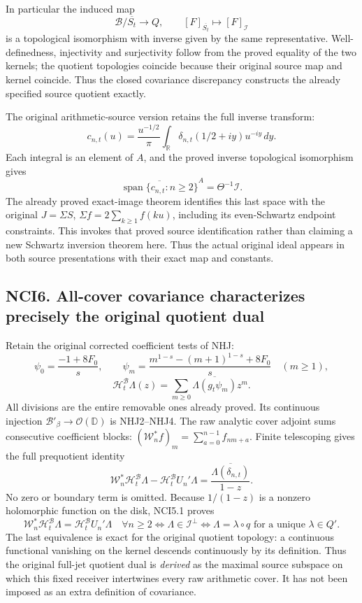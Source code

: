 In particular the induced map \[
\mathcal B/\overline{S_t}\longrightarrow Q,
\qquad [F]_{\overline{S_t}}\longmapsto[F]_{\mathcal I}
\tag{NCI5.3}
\] is a topological isomorphism with inverse given by the same
representative. Well-definedness, injectivity and surjectivity follow
from the proved equality of the two kernels; the quotient topologies
coincide because their original source map and kernel coincide. Thus the
closed covariance discrepancy constructs the already specified source
quotient exactly.

The original arithmetic-source version retains the full inverse
transform: \[
c_{n,t}(u)=\frac{u^{-1/2}}\pi
\int_{\mathbb R}\delta_{n,t}(1/2+iy)u^{-iy}\,dy.
\tag{NCI5.4}
\] Each integral is an element of \(A\), and the proved inverse
topological isomorphism gives \[
\overline{\operatorname{span}\{c_{n,t}:n\ge2\}}^A
=\Theta^{-1}\mathcal I.
\tag{NCI5.5}
\] The already proved exact-image theorem identifies this last space
with the original \(J=\Sigma S\), \(\Sigma f=2\sum_{k\ge1}f(ku)\),
including its even-Schwartz endpoint constraints. This invokes that
proved source identification rather than claiming a new Schwartz
inversion theorem here. Thus the actual original ideal appears in both
source presentations with their exact map and constants.

\subsection{NCI6. All-cover covariance characterizes precisely the
original quotient
dual}\label{nci6.-all-cover-covariance-characterizes-precisely-the-original-quotient-dual}

Retain the original corrected coefficient tests of NHJ: \[
\psi_0=\frac{-1+8F_0}s,\qquad
\psi_m=\frac{m^{1-s}-(m+1)^{1-s}+8F_0}s\quad(m\ge1),
\] \[
\mathcal H_t^{\mathcal B}\Lambda(z)
=\sum_{m\ge0}\overline{\Lambda(g_t\psi_m)}z^m.
\tag{NCI6.1}
\] All divisions are the entire removable ones already proved. Its
continuous injection \(\mathcal B'_\beta\to\mathcal O(\mathbb D)\) is
NHJ2--NHJ4. The raw analytic cover adjoint sums consecutive coefficient
blocks: \((\mathscr W_n^*f)_m=\sum_{a=0}^{n-1}f_{nm+a}\). Finite
telescoping gives the full prequotient identity \[
\mathscr W_n^*\mathcal H_t^{\mathcal B}\Lambda
-\mathcal H_t^{\mathcal B}U_n'\Lambda
=\frac{\overline{\Lambda(\delta_{n,t})}}{1-z}.
\tag{NCI6.2}
\] No zero or boundary term is omitted. Because \(1/(1-z)\) is a nonzero
holomorphic function on the disk, NCI5.1 proves \[
\boxed{
\mathscr W_n^*\mathcal H_t^{\mathcal B}\Lambda
=\mathcal H_t^{\mathcal B}U_n'\Lambda\quad\forall n\ge2
\iff\Lambda\in\mathcal I^\perp
\iff\Lambda=\lambda\circ q\text{ for a unique }\lambda\in Q'.}
\tag{NCI6.3}
\] The last equivalence is exact for the original quotient topology: a
continuous functional vanishing on the kernel descends continuously by
its definition. Thus the original full-jet quotient dual is
\emph{derived} as the maximal source subspace on which this fixed
receiver intertwines every raw arithmetic cover. It has not been imposed
as an extra definition of covariance.

